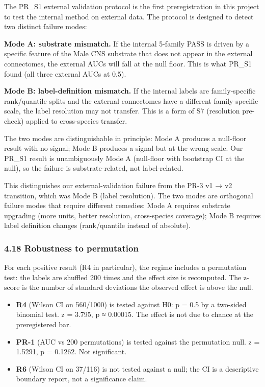 \documentclass[
]{article}
\providecommand{\tightlist}{%
  \setlength{\itemsep}{0pt}\setlength{\parskip}{0pt}}
\begin{document}
The PR\_S1 external validation protocol is the first preregistration in
this project to test the internal method on external data. The protocol
is designed to detect two distinct failure modes:

\textbf{Mode A: substrate mismatch.} If the internal 5-family PASS is
driven by a specific feature of the Male CNS substrate that does not
appear in the external connectomes, the external AUCs will fall at the
null floor. This is what PR\_S1 found (all three external AUCs at 0.5).

\textbf{Mode B: label-definition mismatch.} If the internal labels are
family-specific rank/quantile splits and the external connectomes have a
different family-specific scale, the label resolution may not transfer.
This is a form of S7 (resolution pre-check) applied to cross-species
transfer.

The two modes are distinguishable in principle: Mode A produces a
null-floor result with no signal; Mode B produces a signal but at the
wrong scale. Our PR\_S1 result is unambiguously Mode A (null-floor with
bootstrap CI at the null), so the failure is substrate-related, not
label-related.

This distinguishes our external-validation failure from the PR-3 v1 → v2
transition, which was Mode B (label resolution). The two modes are
orthogonal failure modes that require different remedies: Mode A
requires substrate upgrading (more units, better resolution,
cross-species coverage); Mode B requires label definition changes
(rank/quantile instead of absolute).

\subsubsection{4.18 Robustness to
permutation}\label{robustness-to-permutation}

For each positive result (R4 in particular), the regime includes a
permutation test: the labels are shuffled 200 times and the effect size
is recomputed. The z-score is the number of standard deviations the
observed effect is above the null.

\begin{itemize}
\tightlist
\item
  \textbf{R4} (Wilson CI on 560/1000) is tested against H0: p = 0.5 by a
  two-sided binomial test. z = 3.795, p ≈ 0.00015. The effect is not due
  to chance at the preregistered bar.
\item
  \textbf{PR-1} (AUC vs 200 permutations) is tested against the
  permutation null. z = 1.5291, p = 0.1262. Not significant.
\item
  \textbf{R6} (Wilson CI on 37/116) is not tested against a null; the CI
  is a descriptive boundary report, not a significance claim.
\end{itemize}
\end{document}
